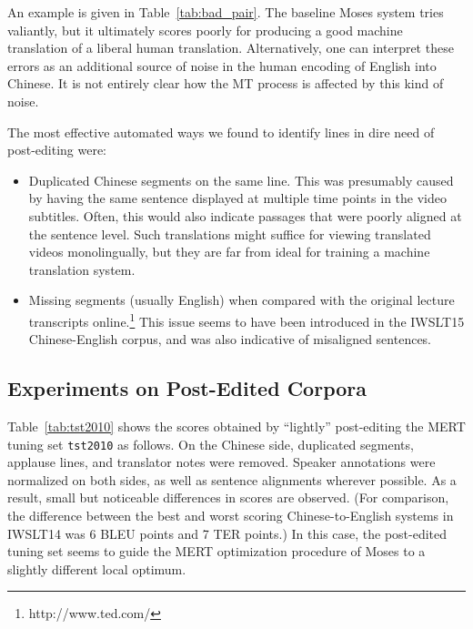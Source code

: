 {An example is given in Table~\ref{tab:bad_pair}.
The baseline Moses system tries valiantly, but it ultimately scores poorly for producing a good machine translation of a liberal human translation.
Alternatively, one can interpret these errors as an additional source of noise in the human encoding of English into Chinese.
It is not entirely clear how the MT process is affected by this kind of noise.

The most effective automated ways we found to identify lines in dire need of post-editing were:
\begin{itemize}
\item 
Duplicated Chinese segments on the same line. 
This was presumably caused by having the same sentence displayed at multiple time points in the video subtitles. 
Often, this would also indicate passages that were poorly aligned at the sentence level.
Such translations might suffice for viewing translated videos monolingually, but they are far from ideal for training a machine translation system.

\item 
Missing segments (usually English) when compared with the original lecture transcripts online.\footnote{http://www.ted.com/} 
This issue seems to have been introduced in the IWSLT15 Chinese-English corpus, and was also indicative of misaligned sentences.
\end{itemize}



\subsection{Experiments on Post-Edited Corpora}
\label{subsec:post_edited}

Table~\ref{tab:tst2010} shows the scores obtained by ``lightly'' post-editing the MERT tuning set {\small \tt tst2010} as follows. 
On the Chinese side, duplicated segments, applause lines, and translator notes were removed. 
Speaker annotations were normalized on both sides, as well as sentence alignments wherever possible.
As a result, small but noticeable differences in scores are observed. 
(For comparison, the difference between the best and worst scoring Chinese-to-English systems in IWSLT14  was 6 BLEU points and 7 TER points.)
In this case, the post-edited tuning set seems to guide the MERT optimization procedure of Moses to a slightly different local optimum.

}
